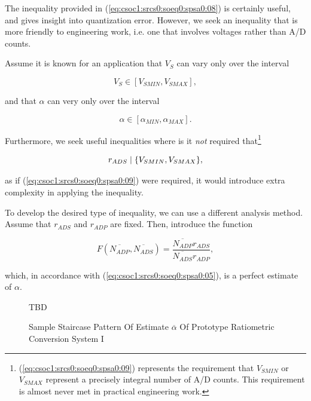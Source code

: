The inequality provided in (\ref{eq:csoc1:srcs0:soeq0:spsa0:08})
is certainly useful, and gives insight into quantization error.  However,
we seek an inequality that is more friendly to engineering work, i.e.
one that involves voltages rather than A/D counts.

Assume it is known for an application that $V_S$ can vary only over the
interval

\begin{equation}
\label{eq:csoc1:srcs0:soeq0:spsa0:08b}
V_S \in [V_{SMIN}, V_{SMAX}], 
\end{equation}


\noindent{}and that $\alpha$ can very only over
the interval 

\begin{equation}
\label{eq:csoc1:srcs0:soeq0:spsa0:08c}
\alpha \in [\alpha_{MIN}, \alpha_{MAX}].
\end{equation}

\noindent{}Furthermore, we
seek useful inequalities where is it \emph{not} required 
that\footnote{(\ref{eq:csoc1:srcs0:soeq0:spsa0:09}) represents the 
requirement that $V_{SMIN}$ or $V_{SMAX}$ represent a precisely 
integral number of A/D
counts.  This requirement is almost never met in practical engineering
work.}

\begin{equation}
\label{eq:csoc1:srcs0:soeq0:spsa0:09}
r_{ADS} \mid \{V_{SMIN},V_{SMAX}\},
\end{equation}

\noindent{}as if (\ref{eq:csoc1:srcs0:soeq0:spsa0:09})
were required, it would introduce extra complexity 
in applying the inequality.

To develop the desired type of inequality, we can use
a different analysis method.  Assume that 
$r_{ADS}$ and $r_{ADP}$ are fixed.  Then, introduce
the function

\begin{equation}
\label{eq:csoc1:srcs0:soeq0:spsa0:10}
F(\overline{N_{ADP}}, \overline{N_{ADS}}) 
= 
\frac{\overline{N_{ADP}} r_{ADS}}{\overline{N_{ADS}} r_{ADP}},
\end{equation}

\noindent{}which, in accordance with (\ref{eq:csoc1:srcs0:soeq0:spsa0:05}),
is a perfect estimate of $\alpha$.

\begin{figure}
\centering
\Huge{TBD}
\caption{Sample Staircase Pattern Of Estimate $\overline{\alpha}$ Of
         Prototype Ratiometric Conversion System I}
\label{fig:csoc1:srcs0:soeq0:spsa0:02}
\end{figure}

